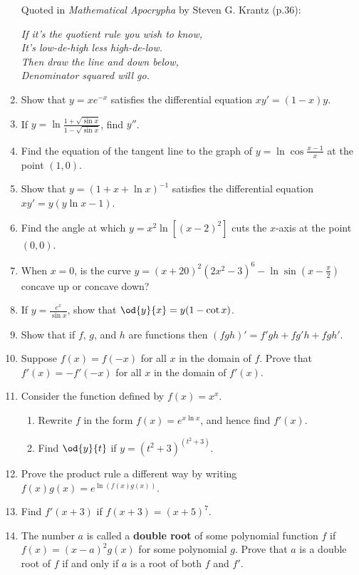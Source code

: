 \begin{enumerate}
        Quoted in \textit{Mathematical Apocrypha} by Steven G. Krantz (p.36):
        \begin{center}\itshape
          If it's the quotient rule you wish to know,\\
          It's low-de-high less high-de-low.\\
          Then draw the line and down below,\\
          Denominator squared will go.
        \end{center}

  \item Show that $ y = xe^{-x} $ satisfies the differential equation $ xy' = (1-x)y $.
  \item If $ y = \ln \frac{1 + \sqrt{\sin x}}{1 - \sqrt{\sin x}} $, find $ y'' $.
  \item Find the equation of the tangent line to the graph of $ y = \ln \cos \frac{x - 1}{x} $ at
        the point $(1, 0)$.
  \item Show that $ y = (1 + x + \ln x)^{-1} $ satisfies the differential equation $ xy' = y(y \ln x - 1) $.
  \item Find the angle at which $ y = x^2 \ln [(x - 2)^2] $ cuts the $ x$-axis at the point $ (0,0) $.
  \item When $ x = 0 $, is the curve $ y = (x + 20)^2 (2x^2 - 3)^6 - \ln \sin (x - \frac{\pi}{2}) $ concave up or concave down?
  \item If $ y = \frac{e^x}{\sin x} $, show that $ \od{y}{x} = y(1 - \cot x) $.
  \item Show that if $ f $, $ g $, and $ h $ are functions then $ (fgh)' = f'gh + fg'h + fgh' $.
  \item Suppose $ f(x) = f(-x) $ for all $ x $ in the domain of $ f $. Prove that $ f'(x) = -f'(-x) $ for all $ x $
        in the domain of $ f'(x) $.
  \item Consider the function defined by $ f(x) = x^x $.
    \begin{enumerate}
      \item Rewrite $ f $ in the form $ f(x) = e^{x \ln x} $, and hence find $ f'(x) $.
      \item Find $ \od{y}{t} $ if $ y = (t^2 + 3)^{(t^2 + 3)} $.
    \end{enumerate}
  \item Prove the product rule a different way by writing $ f(x) g(x) = e^{\ln(f(x) g(x))} $.
  \item Find $ f'(x + 3) $ if $ f(x + 3) = (x + 5)^7 $.
  \item The number $ a $ is called a \textbf{double root} of some polynomial function $ f $ if $ f(x) = (x - a)^2g(x) $ for
        some polynomial $ g $. Prove that $ a $ is a double root of $ f $ if and only if $ a $ is a root of both $ f $ and $ f' $.
\end{enumerate}


